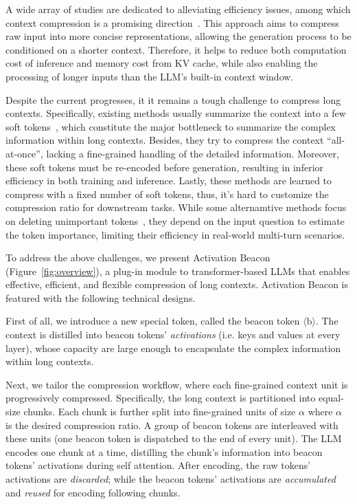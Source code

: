 A wide array of studies are dedicated to alleviating efficiency issues, among which context compression is a promising direction~\citep{wu2023gist,chevalier2023autocompressors,ge2024icae,jiang2023llmlingua,jiang2023longllmlingua}. This approach aims to compress raw input into more concise representations, allowing the generation process to be conditioned on a shorter context. Therefore, it helps to reduce both computation cost of inference and memory cost from KV cache, while also enabling the processing of longer inputs than the LLM's built-in context window. 

Despite the current progresses, it it remains a tough challenge to compress long contexts. Specifically, existing methods usually summarize the context into a few soft tokens~\citep{chevalier2023autocompressors,ge2024icae}, which constitute the major bottleneck to summarize the complex information within long contexts. Besides, they try to compress the context ``all-at-once'', lacking a fine-grained handling of the detailed information. Moreover, these soft tokens must be re-encoded before generation, resulting in inferior efficiency in both training and inference. Lastly, these methods are learned to compress with a fixed number of soft tokens, thus, it's hard to customize the compression ratio for downstream tasks. While some alternamtive methods focus on deleting unimportant tokens~\citep{jiang2023longllmlingua,li2024snapkv}, they depend on the input question to estimate the token importance, limiting their efficiency in real-world multi-turn scenarios. 

To address the above challenges, we present Activation Beacon (Figure~\ref{fig:overview}), a plug-in module to transformer-based LLMs that enables effective, efficient, and flexible compression of long contexts. Activation Beacon is featured with the following technical designs. 

First of all, we introduce a new special token, called the beacon token $\langle\text{b}\rangle$. The context is distilled into beacon tokens' \textit{activations} (i.e. keys and values at every layer), whose capacity are large enough to encapsulate the complex information within long contexts.

Next, we tailor the compression workflow, where each fine-grained context unit is progressively compressed. Specifically, the long context is partitioned into equal-size chunks. Each chunk is further split into fine-grained units of size $\alpha$ where $\alpha$ is the desired compression ratio. A group of beacon tokens are interleaved with these units (one beacon token is dispatched to the end of every unit). The LLM encodes one chunk at a time, distilling the chunk's information into beacon tokens' activations during self attention. After encoding, the raw tokens' activations are \textit{discarded}; while the beacon tokens' activations are \textit{accumulated} and \textit{reused} for encoding following chunks.

